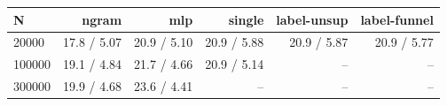 \begin{tabular}{@{}lrrrrr@{}}\toprule
N & ngram & mlp & single & label-unsup & label-funnel\\\midrule
20000 & 17.8 / 5.07 & 20.9 / 5.10 & 20.9 / 5.88 & 20.9 / 5.87 & 20.9 / 5.77\\
100000 & 19.1 / 4.84 & 21.7 / 4.66 & 20.9 / 5.14 & -- & --\\
300000 & 19.9 / 4.68 & 23.6 / 4.41 & -- & -- & --\\
\bottomrule\end{tabular}